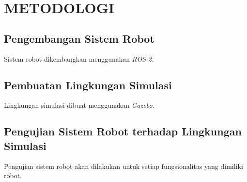 \section{METODOLOGI}

\subsection{Pengembangan Sistem Robot}

Sistem robot dikembangkan menggunakan \emph{ROS 2}.

\subsection{Pembuatan Lingkungan Simulasi}

Lingkungan simulasi dibuat menggunakan \emph{Gazebo}.

\subsection{Pengujian Sistem Robot terhadap Lingkungan Simulasi}

Pengujian sistem robot akan dilakukan untuk setiap fungsionalitas yang dimiliki robot.
